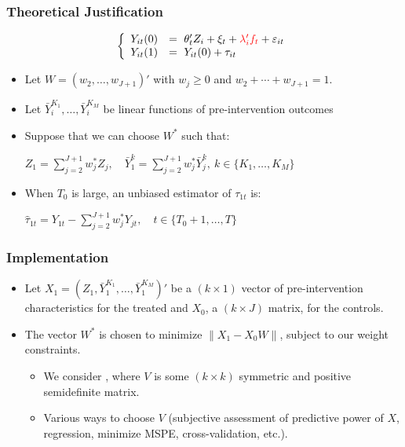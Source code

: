 \documentclass[xcolor=svgnames,9pt,english,t, aspectratio=169]{beamer}
\begin{document}
\begin{frame}
\frametitle{Theoretical Justification}
\[
\hspace{0em}\left\{
  \begin{array}{ll}
  Y_{it}(0) &=\ \theta_{t}'Z_{i} + \xi_{t} + \textcolor{red}{\lambda_{i}'f_{t}} + \varepsilon_{it}\\
  Y_{it}(1) &=\ Y_{it}(0) + \tau_{it} 
  \end{array}
  \right.
\]  
\begin{itemize}\itemsep0.5em
\item Let
$W=(w_2,\ldots,w_{J+1})'$ with $w_j\geq 0$ and
$w_2+\cdots +w_{J+1}=1$.
\item Let $\bar Y_i^{K_1},\ldots, \bar Y_i^{K_M}$ be  linear
 functions of pre-intervention outcomes\pause
\item Suppose that we can choose $W^*$ such that:\medskip
\begin{center}
$Z_1 = \sum_{j=2}^{J+1} w^*_j Z_j,\quad
\bar Y_1^{k} = \sum_{j=2}^{J+1} w^*_j \bar
Y_j^{k},\ k \in \{K_{1},\ldots,K_M\}$
\end{center}\medskip
 \item When $T_{0}$ is large, an  unbiased estimator of $\tau_{1t}$ is:\medskip
\begin{center}
$\widehat \tau_{1t}=Y_{1t} - \sum_{j=2}^{J+1} w^*_j Y_{jt},\quad t\in\{T_0+1,\ldots ,T\}$
\end{center}
\end{itemize}
\end{frame}

\begin{frame}
\frametitle{Implementation}
\begin{itemize}\itemsep1em
\item Let $X_1=(Z_1, \bar Y^{K_1}_1, \ldots, \bar Y^{K_M}_1)'$ be a
$(k\times 1)$ vector of pre-intervention characteristics for the treated and $X_{0}$, a $(k\times J)$ matrix, for the controls.\pause
\item The vector $W^*$ is chosen to minimize $\|X_1-X_0 W\|$, subject to our weight
constraints.\pause\medskip
\begin{itemize}
\item We consider ,
     where $V$ is some $(k\times k)$ symmetric and positive
     semidefinite matrix.\medskip
\item Various ways to choose $V$ (subjective assessment of predictive
power of $X$, regression, minimize MSPE, cross-validation, etc.).
\end{itemize}
\end{itemize}
\end{frame}
\end{document}
